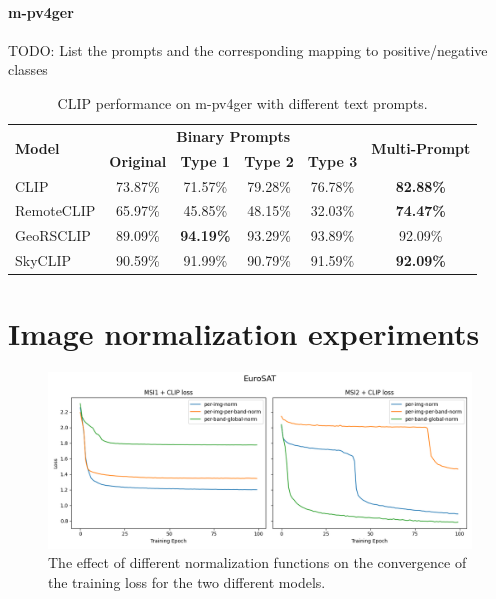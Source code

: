 \documentclass[a4paper, oneside, english]{sapthesis} %
\begin{document}
\paragraph{m-pv4ger}

TODO: List the prompts and the corresponding mapping to positive/negative classes


\begin{table}[ht]
\centering
\footnotesize
\renewcommand{\arraystretch}{1.2} %
    \begin{tabular}{lc|cccc}
    \toprule
    \multirow{2}{*}{\textbf{Model}} & \multicolumn{4}{c}{\textbf{Binary Prompts}} &  \multirow{2}{*}{\textbf{Multi-Prompt}}\\
    \cmidrule(lr){2-5}
    & \textbf{Original} & \textbf{Type 1} & \textbf{Type 2} & \textbf{Type 3} \\
    \midrule
    CLIP & 73.87\% & 71.57\% & 79.28\% & 76.78\% & \textbf{82.88\%} \\
    RemoteCLIP & 65.97\% & 45.85\% & 48.15\% & 32.03\% & \textbf{74.47\%} \\
    GeoRSCLIP & 89.09\% & \textbf{94.19\%} & 93.29\% & 93.89\% & 92.09\% \\
    SkyCLIP & 90.59\% & 91.99\% & 90.79\% & 91.59\% & \textbf{92.09\%} \\
    \bottomrule
    \end{tabular}
\vspace{0.3cm}
\caption{\normalsize CLIP performance on m-pv4ger with different text prompts.}
\label{tab:prompts2}
\end{table}


\section{Image normalization experiments}

\begin{figure}[h]
    \centering
    \includegraphics[width=\textwidth]{img/EuroSAT_norm_losses_plot.png}
    \caption{The effect of different normalization functions on the convergence of the training loss for the two different models.}
    \label{fig:normlosses}
\end{figure}
\end{document}
